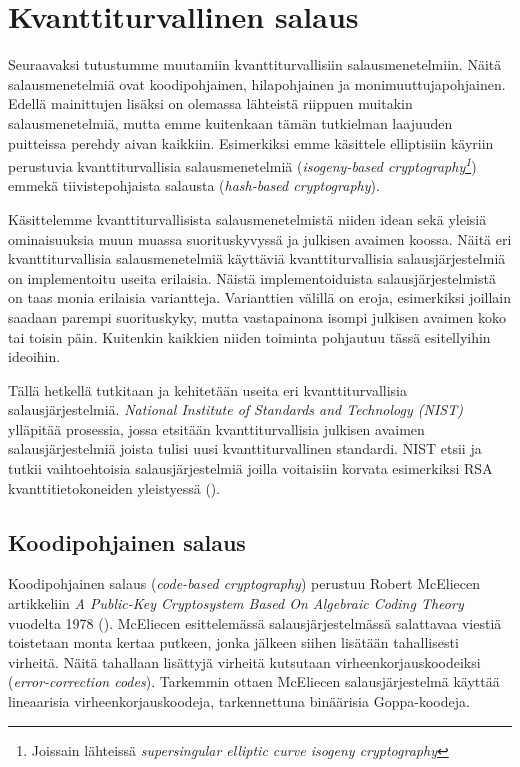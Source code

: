 \chapter{Kvanttiturvallinen salaus\label{results}}
Seuraavaksi tutustumme muutamiin kvanttiturvallisiin salausmenetelmiin. Näitä salausmenetelmiä ovat koodipohjainen, hilapohjainen ja monimuuttujapohjainen. Edellä mainittujen lisäksi on olemassa lähteistä riippuen muitakin salausmenetelmiä, mutta emme kuitenkaan tämän tutkielman laajuuden puitteissa perehdy aivan kaikkiin. Esimerkiksi emme käsittele elliptisiin käyriin perustuvia kvanttiturvallisia salausmenetelmiä (\emph{isogeny-based cryptography\footnote{Joissain lähteissä \emph{supersingular elliptic curve isogeny cryptography}}}) emmekä tiivistepohjaista salausta (\emph{hash-based cryptography}).

Käsittelemme kvanttiturvallisista salausmenetelmistä niiden idean sekä yleisiä ominaisuuksia muun muassa suorituskyvyssä ja julkisen avaimen koossa. Näitä eri kvanttiturvallisia salausmenetelmiä käyttäviä kvanttiturvallisia salausjärjestelmiä on implementoitu useita erilaisia. Näistä implementoiduista salausjärjestelmistä on taas monia erilaisia variantteja. Varianttien välillä on eroja, esimerkiksi joillain saadaan parempi suorituskyky, mutta vastapainona isompi julkisen avaimen koko tai toisin päin. Kuitenkin kaikkien niiden toiminta pohjautuu tässä esitellyihin ideoihin.

Tällä hetkellä tutkitaan ja kehitetään useita eri kvanttiturvallisia salausjärjestelmiä. \emph{National Institute of Standards and Technology (NIST)} ylläpitää prosessia, jossa etsitään kvanttiturvallisia julkisen avaimen salausjärjestelmiä joista tulisi uusi kvanttiturvallinen standardi. NIST etsii ja tutkii vaihtoehtoisia salausjärjestelmiä joilla voitaisiin korvata esimerkiksi RSA kvanttitietokoneiden yleistyessä (\cite{alagic2020status}).

\section{Koodipohjainen salaus}
Koodipohjainen salaus (\emph{code-based cryptography}) perustuu Robert McEliecen artikkeliin \emph{A Public-Key Cryptosystem Based On Algebraic Coding Theory} vuodelta 1978 (\cite{8012331}). McEliecen esittelemässä salausjärjestelmässä salattavaa viestiä toistetaan monta kertaa putkeen, jonka jälkeen siihen lisätään tahallisesti virheitä. Näitä tahallaan lisättyjä virheitä kutsutaan virheenkorjauskoodeiksi (\emph{error-correction codes}). Tarkemmin ottaen McEliecen salausjärjestelmä käyttää lineaarisia virheenkorjauskoodeja, tarkennettuna binäärisia Goppa-koodeja.

